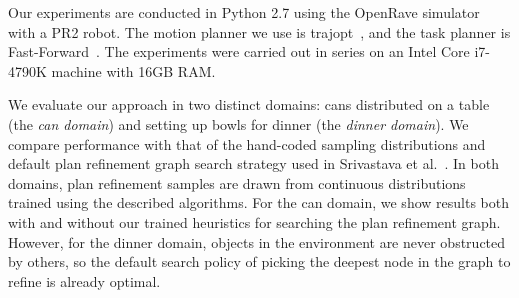 \begin{table}
  \centering
  \vspace{8pt}
  \caption{Percent solved and standard deviation, along with time spent motion planning and number of calls to the motion
planner for the baseline system (B), our system with only learned refinement policies (no graph search heuristics) (L),
and our full system (F). Results using our system are averaged across 10 different sets of weights. Time limit: 300s.}
  \label{table:results}
\end{table}

Our experiments are conducted in Python 2.7 using the OpenRave simulator~\cite{Diankov_2008_6117} with a PR2 robot.
The motion planner we use is trajopt~\cite{schulman2013finding}, and the task planner is Fast-Forward~\cite{FF}.
The experiments were carried out in series on an Intel Core i7-4790K machine with 16GB RAM.

We evaluate our approach in two distinct domains: cans distributed on a table (the \emph{can domain})
and setting up bowls for dinner (the \emph{dinner domain}).
We compare performance with that of the hand-coded sampling distributions and default plan refinement graph search
strategy used in Srivastava et al.~\cite{srivastava2014combined}. In both domains, plan refinement samples
are drawn from continuous distributions trained using the described algorithms. For the can domain, we
show results both with and without our trained heuristics for searching the plan refinement graph. However,
for the dinner domain, objects in the environment are never obstructed by others, so the default search policy
of picking the deepest node in the graph to refine is already optimal.


